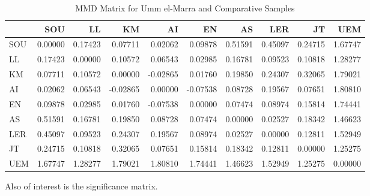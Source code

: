 \documentclass[]{book}
\begin{document}
\begin{table}

\caption{\label{tab:unnamed-chunk-3}MMD Matrix for Umm el-Marra and Comparative Samples}
\centering
\begin{tabular}[t]{l|r|r|r|r|r|r|r|r|r}
\hline
  & SOU & LL & KM & AI & EN & AS & LER & JT & UEM\\
\hline
SOU & 0.00000 & 0.17423 & 0.07711 & 0.02062 & 0.09878 & 0.51591 & 0.45097 & 0.24715 & 1.67747\\
\hline
LL & 0.17423 & 0.00000 & 0.10572 & 0.06543 & 0.02985 & 0.16781 & 0.09523 & 0.10818 & 1.28277\\
\hline
KM & 0.07711 & 0.10572 & 0.00000 & -0.02865 & 0.01760 & 0.19850 & 0.24307 & 0.32065 & 1.79021\\
\hline
AI & 0.02062 & 0.06543 & -0.02865 & 0.00000 & -0.07538 & 0.08728 & 0.19567 & 0.07651 & 1.80810\\
\hline
EN & 0.09878 & 0.02985 & 0.01760 & -0.07538 & 0.00000 & 0.07474 & 0.08974 & 0.15814 & 1.74441\\
\hline
AS & 0.51591 & 0.16781 & 0.19850 & 0.08728 & 0.07474 & 0.00000 & 0.02527 & 0.18342 & 1.46623\\
\hline
LER & 0.45097 & 0.09523 & 0.24307 & 0.19567 & 0.08974 & 0.02527 & 0.00000 & 0.12811 & 1.52949\\
\hline
JT & 0.24715 & 0.10818 & 0.32065 & 0.07651 & 0.15814 & 0.18342 & 0.12811 & 0.00000 & 1.25275\\
\hline
UEM & 1.67747 & 1.28277 & 1.79021 & 1.80810 & 1.74441 & 1.46623 & 1.52949 & 1.25275 & 0.00000\\
\hline
\end{tabular}
\end{table}

Also of interest is the significance matrix.
\end{document}
